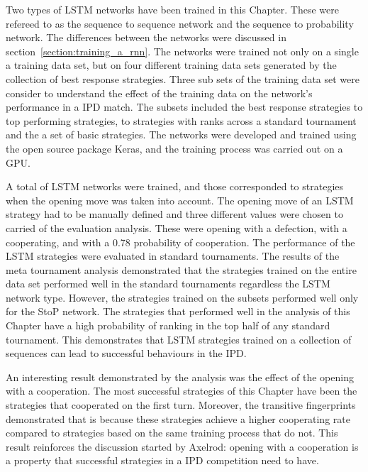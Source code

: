 Two types of LSTM networks have been trained in this Chapter. These were
refereed to as the sequence to sequence network and the sequence to probability
network. The differences between the networks were discussed in
section~\ref{section:training_a_rnn}. The networks were trained not only on a
single a training data set, but on four different training data sets generated
by the collection of best response strategies. Three sub sets of the training
data set were consider to understand the effect of the training data on the
network's performance in a IPD match. The subsets included the best response
strategies to top performing strategies, to strategies with ranks across a
standard tournament and the a set of basic strategies. The networks were
developed and trained using the open source package Keras, and the training
process was carried out on a GPU.

A total of \lstmnetworks LSTM networks were trained, and those corresponded to
\lstmstrategies strategies when the opening move was taken into account. The
opening move of an LSTM strategy had to be manually defined and three different
values were chosen to carried of the evaluation analysis. These were opening
with a defection, with a cooperating, and with a 0.78 probability of
cooperation. The performance of the \lstmstrategies LSTM strategies were
evaluated in \metatournamentslstm standard tournaments. The results of the
meta tournament analysis demonstrated that the strategies trained on the entire
data set performed well in the \metatournamentslstm standard tournaments
regardless the LSTM network type. However, the strategies trained on the
subsets performed well only for the StoP network. The strategies that performed
well in the analysis of this Chapter have a high probability of ranking
in the top half of any standard tournament. This demonstrates that LSTM
strategies trained on a collection of sequences can lead to successful behaviours
in the IPD.

An interesting result demonstrated by the analysis was the effect of the opening
with a cooperation. The most successful strategies of this Chapter have been
the strategies that cooperated on the first turn. Moreover, the transitive
fingerprints demonstrated that is because these strategies achieve a higher
cooperating rate compared to strategies based on the same training process
that do not. This result reinforces the discussion started by
Axelrod: opening with a cooperation is a property that
successful strategies in a IPD competition need to have.
